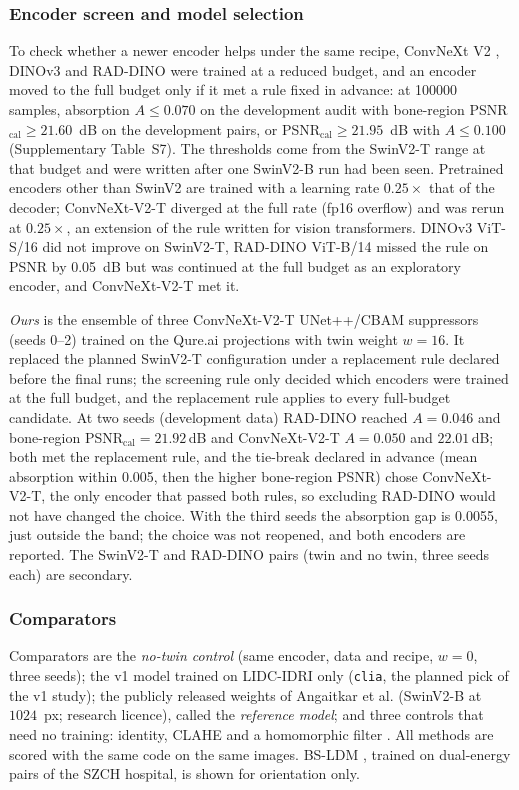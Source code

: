 \subsubsection{Encoder screen and model selection}
\label{sec:m-encoders}
To check whether a newer encoder helps under the same recipe, ConvNeXt V2 \cite{woo2023convnextv2}, DINOv3 \cite{simeoni2025dinov3} and
RAD-DINO \cite{perezgarcia2025raddino} were trained at a reduced budget, and an encoder moved to the full budget only if it met a rule
fixed in advance: at \num{100000} samples, absorption $A\le0.070$ on the development audit with bone-region PSNR$_{\mathrm{cal}}\ge21.60$~dB
on the development pairs, or PSNR$_{\mathrm{cal}}\ge21.95$~dB with $A\le0.100$ (Supplementary Table~S7). The thresholds come from the
SwinV2-T range at that budget and were written after one SwinV2-B run had been seen. Pretrained encoders other than SwinV2 are trained with
a learning rate $0.25\times$ that of the decoder; ConvNeXt-V2-T diverged at the full rate (fp16 overflow) and was rerun at $0.25\times$, an
extension of the rule written for vision transformers. DINOv3 ViT-S/16 did not improve on SwinV2-T, RAD-DINO ViT-B/14 missed the rule on
PSNR by 0.05~dB but was continued at the full budget as an exploratory encoder, and ConvNeXt-V2-T met it.

\emph{Ours} is the ensemble of three ConvNeXt-V2-T UNet++/CBAM suppressors (seeds 0--2) trained on the Qure.ai projections with twin weight
$w=16$. It replaced the planned SwinV2-T configuration under a replacement rule declared before the final runs; the screening rule only
decided which encoders were trained at the full budget, and the replacement rule applies to every full-budget candidate. At two seeds
(development data) RAD-DINO reached $A=0.046$ and bone-region PSNR$_{\mathrm{cal}}=21.92$\,dB and ConvNeXt-V2-T $A=0.050$ and $22.01$\,dB;
both met the replacement rule, and the tie-break declared in advance (mean absorption within 0.005, then the higher bone-region PSNR) chose
ConvNeXt-V2-T, the only encoder that passed both rules, so excluding RAD-DINO would not have changed the choice. With the third seeds the
absorption gap is 0.0055, just outside the band; the choice was not reopened, and both encoders are reported. The SwinV2-T and RAD-DINO
pairs (twin and no twin, three seeds each) are secondary.

\subsubsection{Comparators}
Comparators are the \emph{no-twin control} (same encoder, data and recipe, $w=0$, three seeds); the v1 model trained on LIDC-IDRI only
(\texttt{clia}, the planned pick of the v1 study); the publicly released weights of Angaitkar et al. \cite{angaitkar2026anatomy} (SwinV2-B
at $1024$~px; research licence), called the \emph{reference model}; and three controls that need no training: identity, CLAHE
\cite{zuiderveld1994clahe} and a homomorphic filter \cite{oppenheim1968homomorphic}. All methods are scored with the same code on the same
images. BS-LDM \cite{sun2026bsldm}, trained on dual-energy pairs of the SZCH hospital, is shown for orientation only.

